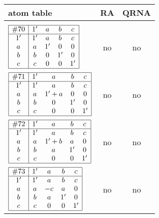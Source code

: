 \documentclass[12pt]{article}
\theoremstyle{definition}
\newcommand{\join}{\mathbin{+}}%
\newcommand{\id}{{1'}}%
\begin{document}
\begin{center}
\begin{longtable}{l|c|c}
  atom table & RA  & QRNA \\ \hline && \\[-4mm]  \endhead 
  \hline \endfoot 
 
$
\begin{array}{|c|cccc|} \hline
\#70 & \id & a & b & c \\ \hline
\id & \id & a & b & c \\
a & a & \id & 0 & 0 \\
b & b & 0 & \id & 0 \\
c & c & 0 & 0 & \id \\ \hline
\end{array}
$
 & no  
 & no      \\[15mm]

$
\begin{array}{|c|cccc|} \hline
\#71 & \id & a & b & c \\ \hline
\id & \id & a & b & c \\
a & a & \id \join a & 0 & 0 \\
b & b & 0 & \id & 0 \\
c & c & 0 & 0 & \id \\ \hline
\end{array}
$
 & no  
 & no      \\[15mm]

$
\begin{array}{|c|cccc|} \hline
\#72 & \id & a & b & c \\ \hline
\id & \id & a & b & c \\
a & a & \id \join b & a & 0 \\
b & b & a & \id & 0 \\
c & c & 0 & 0 & \id \\ \hline
\end{array}
$
 & no  
 & no      \\[15mm]

$
\begin{array}{|c|cccc|} \hline
\#73 & \id & a & b & c \\ \hline
\id & \id & a & b & c \\
a & a & -c & a & 0 \\
b & b & a & \id & 0 \\
c & c & 0 & 0 & \id \\ \hline
\end{array}
$
 & no  
 & no      \\[15mm]


\end{longtable}
\end{center}
\end{document}
